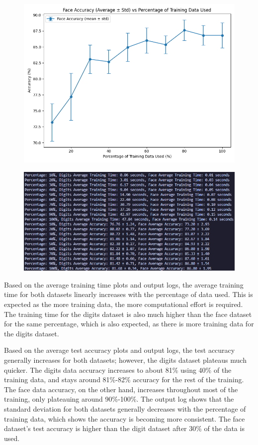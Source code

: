 \documentclass{article}
\begin{document}
\begin{figure}[H]
    \centering
    \includegraphics[width=.75\textwidth]{report/report_figures/perceptron_face_acc.png}
\end{figure}
\begin{figure}[H]
    \centering
    \includegraphics[width=.75 \textwidth]{report/report_figures/perceptron_output_log.png}
\end{figure}

\noindent Based on the average training time plots and output logs, the average training time for both datasets linearly increases with the percentage of data used. This is expected as the more training data, the more computational effort is required. The training time for the digits dataset is also much higher than the face dataset for the same percentage, which is also expected, as there is more training data for the digits dataset. 

\noindent Based on the average test accuracy plots and output logs, the test accuracy generally increases for both datasets; however, the digits dataset plateaus much quicker. The digits data accuracy increases to about 81\% using 40\% of the training data, and stays around 81\%-82\% accuracy for the rest of the training. The face data accuracy, on the other hand, increases throughout most of the training, only plateauing around 90\%-100\%. The output log shows that the standard deviation for both datasets generally decreases with the percentage of training data, which shows the accuracy is becoming more consistent. The face dataset's test accuracy is higher than the digit dataset after 30\% of the data is used. 
\end{document}
